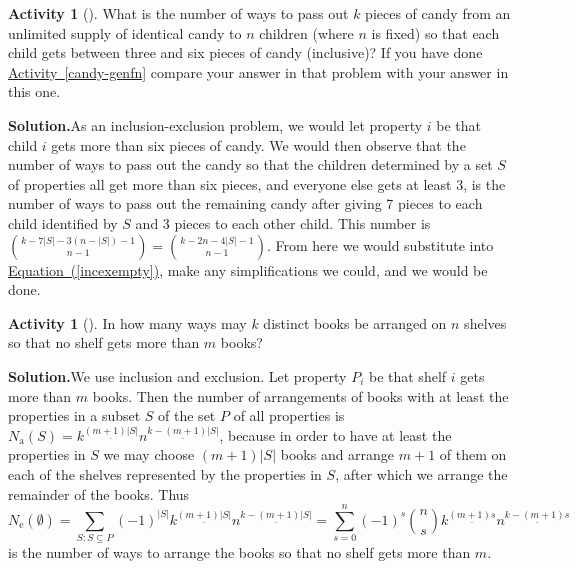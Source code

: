 \documentclass[10pt,]{book}
\theoremstyle{plain}
\theoremstyle{definition}
\newtheorem{activity}[project]{Activity}
\numberwithin{equation}{chapter}
\begin{document}
\begin{activity}[]\label{activity-228}
What is the number of ways to pass out \(k\) pieces of candy from an unlimited supply of identical candy to \(n\) children (where \(n\) is fixed) so that each child gets between three and six pieces of candy (inclusive)? If you have done \hyperref[candy-genfn]{Activity~\ref{candy-genfn}} compare your answer in that problem with your answer in this one.%
\par\medskip\noindent%
\textbf{Solution.}\quad As an inclusion-exclusion problem, we would let property \(i\) be that child \(i\) gets more than six pieces of candy. We would then observe that the number of ways to pass out the candy so that the children determined by a set \(S\) of properties all get more than six pieces, and everyone else gets at least 3, is the number of ways to pass out the remaining candy after giving 7 pieces to each child identified by \(S\) and 3 pieces to each other child. This number is \(\binom{k-7|S|-3(n-|S|)-1}{n-1}=\binom{k-2n-4|S|-1}{n-1}\). From here we would substitute into \hyperref[incexempty]{Equation~(\ref{incexempty})}, make any simplifications we could, and we would be done.%
\end{activity}
\begin{activity}[]\label{activity-229}
In how many ways may \(k\) distinct books be arranged on \(n\) shelves so that no shelf gets more than \(m\) books?%
\par\medskip\noindent%
\textbf{Solution.}\quad We use inclusion and exclusion. Let property \(P_i\) be that shelf \(i\) gets more than \(m\) books. Then the number of arrangements of books with at least the properties in a subset \(S\) of the set \(P\) of all properties is \(N_{\mbox{a} }(S) = k^{\underline{(m+1)|S|}}n^{\underline{k-(m+1)|S|}}\), because in order to have at least the properties in \(S\) we may choose \((m+1)|S|\) books and arrange \(m+1\) of them on each of the shelves represented by the properties in \(S\), after which we arrange the remainder of the books. Thus%
\begin{equation*}
N_{\mbox{e} }(\emptyset)=\sum_{S:S\subseteq P} (-1)^{|S|}
k^{\underline{(m+1)|S|}}n^{\underline{k-(m+1)|S|}}=\sum_{s=0}^n
(-1)^s\binom{n}{s}k^{\underline{(m+1)s}}n^{\underline{k-(m+1)s}}
\end{equation*}
is the number of ways to arrange the books so that no shelf gets more than \(m\).%
\end{activity}
\end{document}

